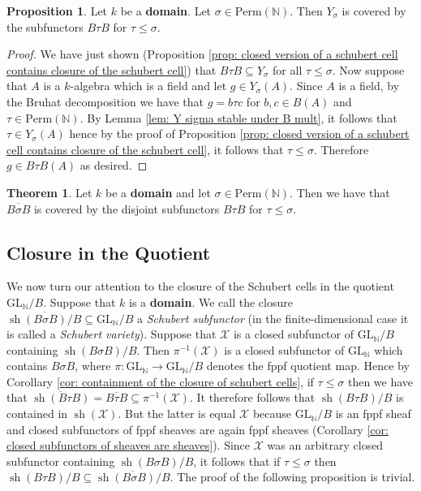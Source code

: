 \documentclass[oneside,11pt]{amsart}
\newcommand{\nn}{\ensuremath{\mathbb{N}}}
\newcommand{\mX}{\ensuremath{\mathcal{X}}}
\newcommand{\GL}{\ensuremath{\text{GL}}}
\newcommand{\Perm}{\ensuremath{\text{Perm}}}
\newcommand{\sh}{\operatorname{sh}}
\theoremstyle{definition}
\newtheorem{proof techniques}{Proof Techniques}
\newtheorem{theorem}{Theorem}
\newtheorem{proposition}{Proposition}
\begin{document}
\begin{proposition}\label{prop: y subfunctor is covered by schubert cells}
Let $k$ be a \textbf{domain}. Let $\sigma \in \Perm(\nn)$. Then $Y_\sigma$ is covered by the subfunctors $B \tau B$ for $\tau \leq \sigma$. 
\end{proposition}

\begin{proof}
We have just shown (Proposition \ref{prop: closed version of a schubert cell contains closure of the schubert cell}) that $B \tau B \subseteq Y_\sigma$ for all $\tau \leq \sigma$. Now suppose that $A$ is a $k$-algebra which is a field and let $g \in Y_\sigma(A)$. Since $A$ is a field, by the Bruhat decomposition we have that $g = b \tau c$ for $b , c \in B(A)$ and $\tau \in \Perm(\nn)$. By Lemma \ref{lem: Y sigma stable under B mult}, it follows that $\tau \in Y_\sigma(A)$ hence by the proof of Proposition \ref{prop: closed version of a schubert cell contains closure of the schubert cell}, it follows that $\tau \leq \sigma$. Therefore $g \in B \tau B(A)$ as desired. 
\end{proof}


\begin{theorem}
Let $k$ be a \textbf{domain} and let $\sigma \in \Perm(\nn)$. Then we have that $\overline{B \sigma B}$ is covered by the disjoint subfunctors $B \tau B$ for $\tau \leq \sigma$. 
\end{theorem}




\subsection{Closure in the Quotient}

We now turn our attention to the closure of the Schubert cells in the quotient $\GL_\nn/B$. Suppose that $k$ is a \textbf{domain}. We call the closure $\overline{\sh(B \sigma B) / B} \subseteq \GL_\nn/B$ a \emph{Schubert subfunctor} (in the finite-dimensional case it is called a \emph{Schubert variety}). Suppose that $\mX$ is a closed subfunctor of $\GL_\nn/B$ containing $\sh(B \sigma B) / B$. Then $\pi^{-1}(\mX)$ is a closed subfunctor of $\GL_\nn$ which contains $B \sigma B$, where $\pi : \GL_\nn \to \GL_\nn/B$ denotes the fppf quotient map. Hence by Corollary \ref{cor: containment of the closure of schubert cells}, if $\tau \leq \sigma$ then we have that $\overline{\sh(B \tau B)} = \overline{B \tau B} \subseteq \pi^{-1}(\mX)$. It therefore follows that $\sh(B \tau B) / B$ is contained in $\sh( \mX)$. But the latter is equal $\mX$ because $\GL_\nn/B$ is an fppf sheaf and closed subfunctors of fppf sheaves are again fppf sheaves (Corollary \ref{cor: closed subfunctors of sheaves are sheaves}). Since $\mX$ was an arbitrary closed subfunctor containing $\sh(B \sigma B) / B$, it follows that if $\tau \leq \sigma$ then $\sh(B \tau B) / B \subseteq \overline{\sh(B \sigma B) / B}$. The proof of the following proposition is trivial. 
\end{document}
